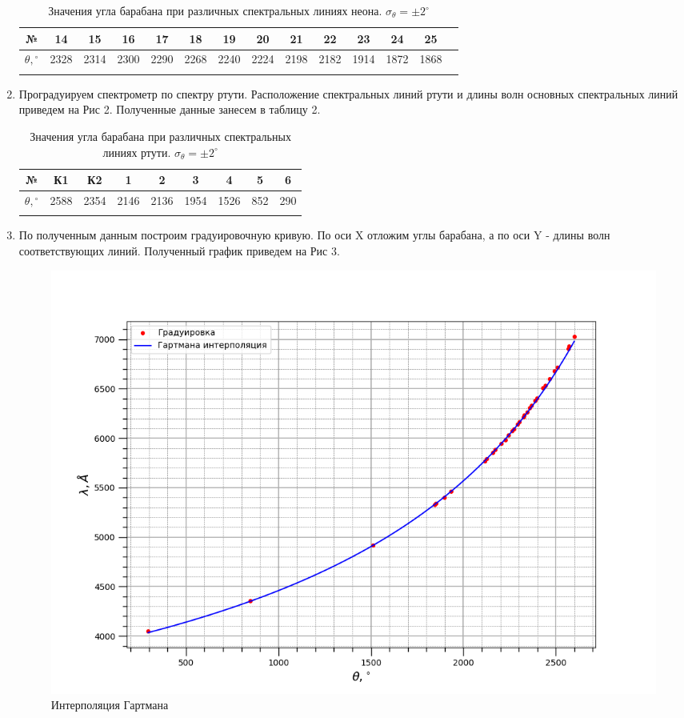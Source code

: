 \documentclass[a4paper, 12pt]{article}%
\begin{document}
\begin{enumerate}
\begin{longtable}{|c|c|c|c|c|c|c|c|c|c|c|c|c|c|}
			\hline 
			
			№ & 14 & 15 & 16 & 17 & 18 & 19 & 20 & 21 & 22 & 23 & 24 & 25 &  \\ \hline
			$\theta, {}^\circ$ & 2328 & 2314 & 2300 & 2290 & 2268 & 2240 & 2224 & 2198 & 2182 & 1914 & 1872 & 1868 &  \\ \hline
			
			\caption{Значения угла барабана при различных спектральных линиях неона. $\sigma_{\theta} = \pm2^\circ$}
		\end{longtable}
	
		\item Проградуируем спектрометр по спектру ртути. Расположение спектральных линий ртути и длины волн основных спектральных линий приведем на Рис 2. Полученные данные занесем в таблицу 2.
		
		\begin{longtable}{|c|c|c|c|c|c|c|c|c|}
			\hline
			№ & К1 & К2 & 1 & 2 & 3 & 4 & 5 & 6  \\ \hline
			$\theta, {}^\circ$ & 2588 & 2354 & 2146 & 2136 & 1954 & 1526 & 852 & 290 \\ \hline
			
			\caption{Значения угла барабана при различных спектральных линиях ртути. $\sigma_{\theta} = \pm2^\circ$}
		\end{longtable}
		
		
		\item По полученным данным построим градуировочную кривую. По оси X отложим углы барабана, а по оси Y - длины волн соответствующих линий. Полученный график приведем на Рис 3. 
		
	
		\begin{figure}[H]
			\centering
			\includegraphics[width=1.1\linewidth]{approx}
			\caption{Интерполяция Гартмана}
		\end{figure}
		

\end{enumerate}
\end{document}
